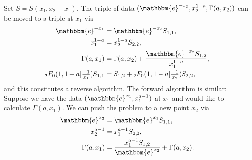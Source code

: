 \documentclass[12pt]{article}
\newcommand{\ee}[0] {\mathbbm{e}}
\numberwithin{equation}{section}
\begin{document}
Set $S = S(x_1, x_2-x_1)$. The triple of data $(\ee^{-x_2}, x_2^{1-a}, \Gamma(a, x_2))$ can be moved to a triple at $x_1$ via
\begin{align*}
\ee^{-x_1} &= \ee^{-x_2} S_{1,1}\text{,}\\
x_1^{1-a} &= x_2^{1-a} S_{2,2}\text{,}\\
\Gamma(a, x_1) &= \Gamma(a,x_2) + \frac{\ee^{-x_2} S_{1,2}}{x_1^{1-a}}\text{,}\\
{}_2 F_0(1,1-a|\tfrac{-1}{x_1}) S_{1,1} &= S_{1,2}+ {}_2 F_0(1,1-a|\tfrac{-1}{x_2}) S_{2,2}\text{,}
\end{align*}
and this constitutes a reverse algorithm. The forward algorithm is similar: Suppose we have the data $(\ee^{x_1}, x_1^{a-1})$ at $x_1$ and would like to calculate $\Gamma(a,x_1)$. We can push the problem to a new point $x_2$ via
\begin{align*}
\ee^{x_2} &= \ee^{x_1} S_{1,1}\text{,}\\
x_2^{a-1} &= x_1^{a-1} S_{2,2}\text{,}\\
\Gamma(a, x_1) &= \frac{x_1^{a-1} S_{1,2}}{ \ee^{x_2}} + \Gamma(a,x_2)\text{.}
\end{align*}
\end{document}
